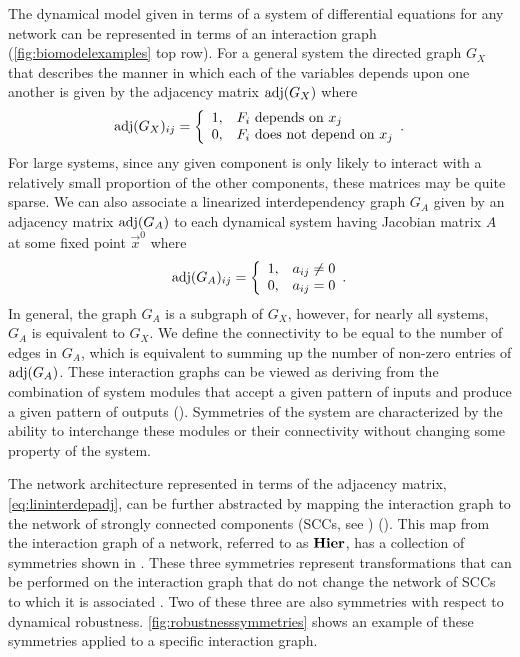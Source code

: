 The dynamical model given in terms of a system of differential equations for any network can be represented in terms of an interaction graph (\ref{fig:biomodelexamples} top row).
For a general system the directed graph $G_X$ that describes the manner in which each of the variables depends upon one another is given by the adjacency matrix $\mathrm{adj}(G_X)$ where
 \begin{displaymath}
   \mathrm{adj}(G_X)_{ij} = \left\{
     \begin{array}{ll}
       1, & F_i \hbox{ depends on } x_j\\
       0, & F_i \hbox{ does not depend on } x_j
     \end{array}.
   \right.
\end{displaymath}
For large systems, since any given component is only likely to interact with a relatively small proportion of the other components, these matrices may be quite sparse.
We can also associate a linearized interdependency graph $G_A$ given by an adjacency matrix $\mathrm{adj}(G_A)$ to each dynamical system having Jacobian matrix $A$ at some fixed point $\vec{x}^0$ where
 \begin{equation}\label{eq:lininterdepadj}
   \mathrm{adj}(G_A)_{ij} = \left\{
     \begin{array}{lr}
       1, & a_{ij} \neq 0\\
       0, & a_{ij} = 0
     \end{array}.
   \right.
\end{equation}
In general, the graph $G_A$ is a subgraph of $G_X$, however, for nearly all systems, $G_A$ is equivalent to $G_X$. We define the connectivity to be equal to the number of edges in $G_A$, which is equivalent to summing up the number of non-zero entries of $\mathrm{adj}(G_A)$.
These interaction graphs can be viewed as deriving from the combination of system modules that accept a given pattern of inputs and produce a given pattern of outputs (). Symmetries of the system are characterized by the ability to interchange these modules or their connectivity without changing some property of the system.

The network architecture represented in terms of the adjacency matrix, \ref{eq:lininterdepadj}, can be further abstracted by mapping the interaction graph to the network of strongly connected components (SCCs, see ) (). This map from the interaction graph of a network, referred to as $\mathbf{Hier}$, has a collection of symmetries shown in . These three symmetries represent transformations that can be performed on the interaction graph that do not change the network of SCCs to which it is associated . Two of these three are also symmetries with respect to dynamical robustness. \ref{fig:robustnesssymmetries} shows an example of these symmetries applied to a specific interaction graph.

